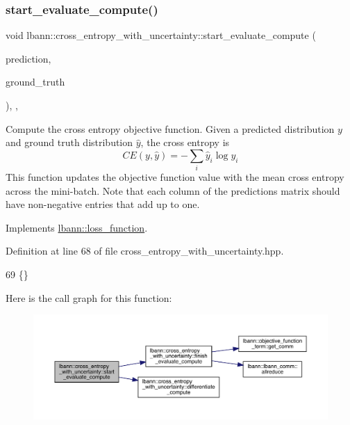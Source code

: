 \mbox{\label{classlbann_1_1cross__entropy__with__uncertainty_abed10e5c6eb2fd72b3b72ad1042fe35c}} 
\subsubsection{\texorpdfstring{start\+\_\+evaluate\+\_\+compute()}{start\_evaluate\_compute()}}
{\footnotesize\ttfamily void lbann\+::cross\+\_\+entropy\+\_\+with\+\_\+uncertainty\+::start\+\_\+evaluate\+\_\+compute (\begin{DoxyParamCaption}\item[{const \hyperlink{base_8hpp_a9a697a504ae84010e7439ffec862b470}{Abs\+Dist\+Mat} \&}]{prediction,  }\item[{const \hyperlink{base_8hpp_a9a697a504ae84010e7439ffec862b470}{Abs\+Dist\+Mat} \&}]{ground\+\_\+truth }\end{DoxyParamCaption})\hspace{0.3cm}{\ttfamily [inline]}, {\ttfamily [override]}, {\ttfamily [virtual]}}

Compute the cross entropy objective function. Given a predicted distribution $y$ and ground truth distribution $\hat{y}$, the cross entropy is \[ CE(y,\hat{y}) = - \sum\limits_{i} \hat{y}_i \log y_i \] This function updates the objective function value with the mean cross entropy across the mini-\/batch. Note that each column of the predictions matrix should have non-\/negative entries that add up to one. 

Implements \hyperlink{classlbann_1_1loss__function_a0bbe41060d788dc7a29f3737761a6f7d}{lbann\+::loss\+\_\+function}.



Definition at line 68 of file cross\+\_\+entropy\+\_\+with\+\_\+uncertainty.\+hpp.


\begin{DoxyCode}
69                                                                        \{\}
\end{DoxyCode}
Here is the call graph for this function\+:\nopagebreak
\begin{figure}[H]
\begin{center}
\leavevmode
\includegraphics[width=350pt]{classlbann_1_1cross__entropy__with__uncertainty_abed10e5c6eb2fd72b3b72ad1042fe35c_cgraph}
\end{center}
\end{figure}


